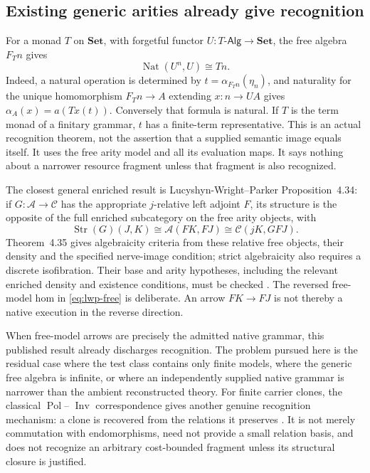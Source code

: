 \documentclass[11pt]{article}
\theoremstyle{definition}
\theoremstyle{remark}
\newcommand{\Set}{\mathbf{Set}}
\newcommand{\Nat}{\operatorname{Nat}}
\newcommand{\Str}{\operatorname{Str}}
\begin{document}
\subsection{Existing generic arities already give recognition}
For a monad $T$ on $\Set$, with forgetful functor
$U:T\text{-}\mathsf{Alg}\to\Set$, the free algebra $F_Tn$ gives
\begin{equation}\label{eq:allmodels}
              \Nat(U^n,U)\cong Tn.
\end{equation}
Indeed, a natural operation is determined by
$t=\alpha_{F_Tn}(\eta_n)$, and naturality for the unique homomorphism
$F_Tn\to A$ extending $x:n\to UA$ gives
$\alpha_A(x)=a(Tx(t))$. Conversely that formula is natural. If $T$ is the
term monad of a finitary grammar, $t$ has a finite-term representative.
This is an actual recognition theorem, not the assertion that a supplied
semantic image equals itself. It uses the free arity model and all its
evaluation maps. It says nothing about a narrower resource fragment unless
that fragment is also recognized.

The closest general enriched result is Lucyshyn-Wright--Parker
Proposition~4.34: if $G:\mathcal A\to\mathcal C$ has the appropriate
$j$-relative left adjoint $F$, its structure is the opposite of the full
enriched subcategory on the free arity objects, with
\begin{equation}\label{eq:lwp-free}
 \Str(G)(J,K)\cong\mathcal A(FK,FJ)
                   \cong\mathcal C(jK,GFJ).
\end{equation}
Theorem~4.35 gives algebraicity criteria from these relative free objects,
their density and the specified nerve-image condition; strict algebraicity
also requires a discrete isofibration. Their base and arity hypotheses,
including the relevant enriched density and existence conditions, must be
checked \cite{LWP}. The reversed free-model hom in
\eqref{eq:lwp-free} is deliberate. An arrow $FK\to FJ$ is not thereby a
native execution in the reverse direction.

When free-model arrows are precisely the admitted native grammar, this
published result already discharges recognition. The problem pursued here
is the residual case where the test class contains only finite models,
where the generic free algebra is infinite, or where an independently
supplied native grammar is narrower than the ambient reconstructed theory.
For finite carrier clones, the classical $\operatorname{Pol}$--
$\operatorname{Inv}$ correspondence gives another genuine recognition
mechanism: a clone is recovered from the relations it preserves
\cite{Geiger}. It is not merely commutation with endomorphisms, need not
provide a small relation basis, and does not recognize an arbitrary
cost-bounded fragment unless its structural closure is justified.
\end{document}

